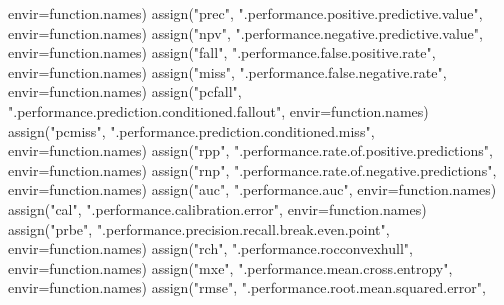 \documentclass[
  letterpaper,
  DIV=11,
  numbers=noendperiod]{scrartcl}
\newenvironment{Shaded}{\begin{snugshade}}{\end{snugshade}}
\newcommand{\AttributeTok}[1]{\textcolor[rgb]{0.40,0.45,0.13}{#1}}
\newcommand{\FunctionTok}[1]{\textcolor[rgb]{0.28,0.35,0.67}{#1}}
\newcommand{\NormalTok}[1]{\textcolor[rgb]{0.00,0.23,0.31}{#1}}
\newcommand{\StringTok}[1]{\textcolor[rgb]{0.13,0.47,0.30}{#1}}
\begin{document}
\begin{Shaded}
\begin{Highlighting}[]
           \AttributeTok{envir=}\NormalTok{function.names)}
    \FunctionTok{assign}\NormalTok{(}\StringTok{"prec"}\NormalTok{, }\StringTok{".performance.positive.predictive.value"}\NormalTok{,}
           \AttributeTok{envir=}\NormalTok{function.names)}
    \FunctionTok{assign}\NormalTok{(}\StringTok{"npv"}\NormalTok{, }\StringTok{".performance.negative.predictive.value"}\NormalTok{,}
           \AttributeTok{envir=}\NormalTok{function.names)}
    \FunctionTok{assign}\NormalTok{(}\StringTok{"fall"}\NormalTok{, }\StringTok{".performance.false.positive.rate"}\NormalTok{, }\AttributeTok{envir=}\NormalTok{function.names)}
    \FunctionTok{assign}\NormalTok{(}\StringTok{"miss"}\NormalTok{, }\StringTok{".performance.false.negative.rate"}\NormalTok{, }\AttributeTok{envir=}\NormalTok{function.names)}
    \FunctionTok{assign}\NormalTok{(}\StringTok{"pcfall"}\NormalTok{, }\StringTok{".performance.prediction.conditioned.fallout"}\NormalTok{,}
           \AttributeTok{envir=}\NormalTok{function.names)}
    \FunctionTok{assign}\NormalTok{(}\StringTok{"pcmiss"}\NormalTok{, }\StringTok{".performance.prediction.conditioned.miss"}\NormalTok{,}
           \AttributeTok{envir=}\NormalTok{function.names)}
    \FunctionTok{assign}\NormalTok{(}\StringTok{"rpp"}\NormalTok{, }\StringTok{".performance.rate.of.positive.predictions"}\NormalTok{,}
           \AttributeTok{envir=}\NormalTok{function.names)}
    \FunctionTok{assign}\NormalTok{(}\StringTok{"rnp"}\NormalTok{, }\StringTok{".performance.rate.of.negative.predictions"}\NormalTok{,}
           \AttributeTok{envir=}\NormalTok{function.names)}
    \FunctionTok{assign}\NormalTok{(}\StringTok{"auc"}\NormalTok{, }\StringTok{".performance.auc"}\NormalTok{, }\AttributeTok{envir=}\NormalTok{function.names)}
    \FunctionTok{assign}\NormalTok{(}\StringTok{"cal"}\NormalTok{, }\StringTok{".performance.calibration.error"}\NormalTok{, }\AttributeTok{envir=}\NormalTok{function.names)}
    \FunctionTok{assign}\NormalTok{(}\StringTok{"prbe"}\NormalTok{, }\StringTok{".performance.precision.recall.break.even.point"}\NormalTok{,}
           \AttributeTok{envir=}\NormalTok{function.names)}
    \FunctionTok{assign}\NormalTok{(}\StringTok{"rch"}\NormalTok{, }\StringTok{".performance.rocconvexhull"}\NormalTok{, }\AttributeTok{envir=}\NormalTok{function.names)}
    \FunctionTok{assign}\NormalTok{(}\StringTok{"mxe"}\NormalTok{, }\StringTok{".performance.mean.cross.entropy"}\NormalTok{, }\AttributeTok{envir=}\NormalTok{function.names)}
    \FunctionTok{assign}\NormalTok{(}\StringTok{"rmse"}\NormalTok{, }\StringTok{".performance.root.mean.squared.error"}\NormalTok{,}

\end{Highlighting}
\end{Shaded}
\end{document}

